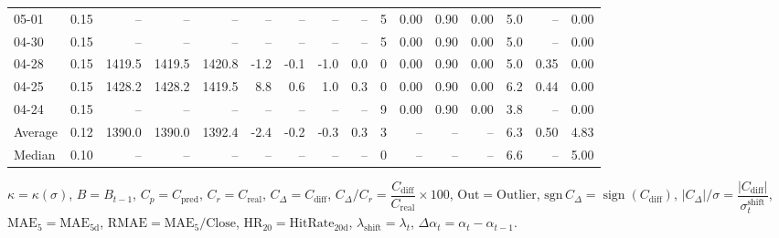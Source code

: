 \begin{threeparttable}
{\begin{tabular}{lrrrrrrrrrrrrrrr}
  05-01 &     0.15 &     -- &     -- &     -- &         -- &             -- &                       -- &                  -- &              5 &       0.00 &      0.90 &           0.00 &              5.0 &              -- &                   0.00 \\
  04-30 &     0.15 &     -- &     -- &     -- &         -- &             -- &                       -- &                  -- &              5 &       0.00 &      0.90 &           0.00 &              5.0 &              -- &                   0.00 \\
  04-28 &     0.15 & 1419.5 & 1419.5 & 1420.8 &       -1.2 &           -0.1 &                     -1.0 &                 0.0 &              0 &       0.00 &      0.90 &           0.00 &              5.0 &            0.35 &                   0.00 \\
  04-25 &     0.15 & 1428.2 & 1428.2 & 1419.5 &        8.8 &            0.6 &                      1.0 &                 0.3 &              0 &       0.00 &      0.90 &           0.00 &              6.2 &            0.44 &                   0.00 \\
  04-24 &     0.15 &     -- &     -- &     -- &         -- &             -- &                       -- &                  -- &              9 &       0.00 &      0.90 &           0.00 &              3.8 &              -- &                   0.00 \\
Average &     0.12 & 1390.0 & 1390.0 & 1392.4 &       -2.4 &           -0.2 &                     -0.3 &                 0.3 &              3 &         -- &        -- &             -- &              6.3 &            0.50 &                   4.83 \\
 Median &     0.10 &     -- &     -- &     -- &         -- &             -- &                       -- &                  -- &              0 &         -- &        -- &             -- &              6.6 &              -- &                   5.00 \\
\bottomrule
\end{tabular}
}
\begin{tablenotes}\footnotesize
\item $\kappa=\kappa(\sigma)$, $B=B_{t-1}$, $C_p=C_{\text{pred}}$, $C_r=C_{\text{real}}$, $C_\Delta=C_{\text{diff}}$, $C_\Delta/C_r=\dfrac{C_{\text{diff}}}{C_{\text{real}}}\times100$, $\mathrm{Out}=\text{Outlier}$, $\mathrm{sgn}\,C_\Delta=\operatorname{sign}(C_{\text{diff}})$, $|C_\Delta|/\sigma=\dfrac{|C_{\text{diff}}|}{\sigma_t^{\text{shift}}}$, $\mathrm{MAE}_5=\mathrm{MAE}_{5\text{d}}$, $\mathrm{RMAE}= \mathrm{MAE}_5 / \text{Close}$, $\mathrm{HR}_{20}=\mathrm{HitRate}_{20\text{d}}$, 
$\lambda_{\text{shift}}=\lambda_t$, 
$\Delta\alpha_t=\alpha_t-\alpha_{t-1}$.
\end{tablenotes}
\end{threeparttable}
\endgroup

